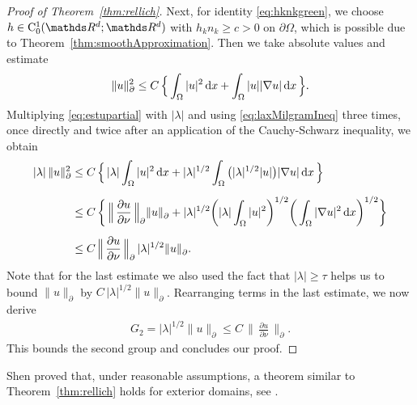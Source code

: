 \begin{proof}[Proof of Theorem~\ref{thm:rellich}]
  Next, for identity \eqref{eq:hknkgreen}, we choose $h \in \CC_0^1(\R^d; \R^d)$ with $h_k n_k \geq c > 0$ on $\partial\Omega$, which is possible due to Theorem~\ref{thm:smoothApproximation}.
  Then we take absolute values and estimate
  \begin{align}
    \label{eq:estupartial}
    \|u\|_\partial^2 \leq C\, \Big\{ \int_\Omega |u|^2 \, {\operatorname{d}\!{x}} +  \int_\Omega |u| |\nabla u| \, {\operatorname{d}\!{x}}\, \Big\}.
  \end{align}
  Multiplying  \eqref{eq:estupartial} with $|\lambda|$ and using \eqref{eq:laxMilgramIneq} three times, once directly and twice after an application of the Cauchy-Schwarz inequality, we obtain 
  \begin{align*}
    |\lambda|\, \|u\|_\partial^2 
    &\leq C\, \Big\{\, |\lambda| \int_\Omega |u|^2 \, {\operatorname{d}\!{x}} + |\lambda|^{1/2}  \int_\Omega \big(|\lambda|^{1/2} |u| \big) |\nabla u| \, {\operatorname{d}\!{x}}\, \Big\} \nonumber\\[0.5em]
    &\leq C\, \bigg\{ \, \Big\|\, \frac{\partial u}{\partial \nu} \, \Big\|^{}_\partial \|u\|^{}_\partial + |\lambda|^{1/2} \bigg( |\lambda|\int_\Omega  |u|^2 \bigg)^{1/2} \bigg( \int_\Omega |\nabla u|^2 \, {\operatorname{d}\!{x}} \bigg)^{1/2} \bigg\} \\[0.5em]
    &\leq C\, \Big\|\,\frac{\partial u}{\partial \nu} \, \Big\|^{}_\partial \, |\lambda|^{1/2}  \|u\|^{}_\partial.
  \end{align*}
  Note that for the last estimate we also used the fact that $|\lambda| \geq \tau$ helps us to bound $\|u\|^{}_\partial$ by $C\, |\lambda|^{1/2} \|u\|^{}_\partial$.
  Rearranging terms in the last estimate, we now derive
  \begin{align}
    \label{eq:lambda12u}
    G_2
    = |\lambda|^{1/2} \|  u\|^{}_\partial 
    \leq C\, \Big\|\, \frac{\partial u}{\partial \nu} \,\Big\|^{}_\partial.
  \end{align}
  This bounds the second group and concludes our proof.
\end{proof}

Shen proved that, under reasonable assumptions, a theorem similar to Theorem~\ref{thm:rellich} holds for exterior domains, see \cite[Thm.\@~4.6]{Shen2012}.

